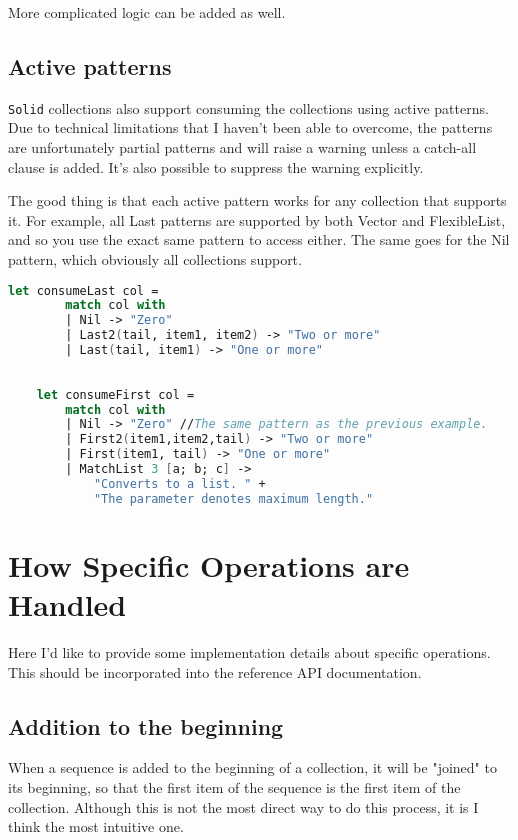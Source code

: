 \documentclass[]{article}
\newcommand{\codeformat}{\ttfamily}
\newcommand{\methodformat}{\codeformat\color{MidnightBlue}}
\newcommand{\method}[1]{{\methodformat #1}}
\newcommand{\solid}{\texttt{Solid}\xspace}
\begin{document}
More complicated logic can be added as well.



\subsection{Active patterns}
\solid collections also support consuming the collections using active patterns. Due to technical limitations that I haven't been able to overcome, the patterns are unfortunately partial patterns and will raise a warning unless a catch-all clause is added. It's also possible to suppress the warning explicitly.

The good thing is that each active pattern works for any collection that supports it. For example, all \method{Last} patterns are supported by both Vector and FlexibleList, and so you use the exact same pattern to access either. The same goes for the \method{Nil} pattern, which obviously all collections support.

\begin{lstlisting}[language=fsharp]
	let consumeLast col = 
		match col with
		| Nil -> "Zero"
		| Last2(tail, item1, item2) -> "Two or more"
		| Last(tail, item1) -> "One or more"
		
		
	let consumeFirst col = 
		match col with
		| Nil -> "Zero" //The same pattern as the previous example.
		| First2(item1,item2,tail) -> "Two or more"
		| First(item1, tail) -> "One or more"
		| MatchList 3 [a; b; c] -> 
			"Converts to a list. " + 
			"The parameter denotes maximum length."
\end{lstlisting}


\section{How Specific Operations are Handled}
Here I'd like to provide some implementation details about specific operations. This should be incorporated into the reference API documentation.

\subsection{Addition to the beginning}\label{sec:ops-addfirstrange}
When a sequence is added to the beginning of a collection, it will be "joined" to its beginning, so that the first item of the sequence is the first item of the collection. Although this is not the most direct way to do this process, it is I think the most intuitive one. 
\end{document}
